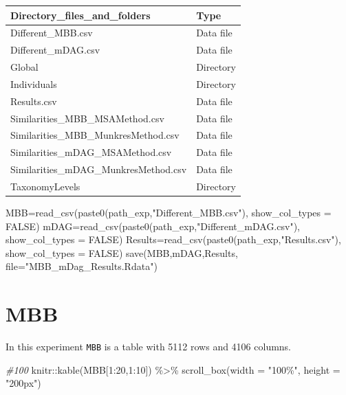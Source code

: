 \documentclass[
  letterpaper,
  DIV=11,
  numbers=noendperiod]{scrreprt}
\newenvironment{Shaded}{}{}
\newcommand{\AttributeTok}[1]{\textcolor[rgb]{0.78,0.47,0.87}{#1}}
\newcommand{\CommentTok}[1]{\textcolor[rgb]{0.36,0.39,0.44}{\textit{#1}}}
\newcommand{\ConstantTok}[1]{\textcolor[rgb]{0.82,0.60,0.40}{#1}}
\newcommand{\DecValTok}[1]{\textcolor[rgb]{0.82,0.60,0.40}{#1}}
\newcommand{\FunctionTok}[1]{\textcolor[rgb]{0.38,0.69,0.94}{#1}}
\newcommand{\NormalTok}[1]{\textcolor[rgb]{0.67,0.70,0.75}{#1}}
\newcommand{\OtherTok}[1]{\textcolor[rgb]{0.15,0.68,0.38}{#1}}
\newcommand{\SpecialCharTok}[1]{\textcolor[rgb]{0.34,0.71,0.76}{#1}}
\newcommand{\StringTok}[1]{\textcolor[rgb]{0.60,0.76,0.47}{#1}}
\begin{document}
\begin{tabular}{l|l}
\hline
Directory\_files\_and\_folders & Type\\
\hline
Different\_MBB.csv & Data file\\
\hline
Different\_mDAG.csv & Data file\\
\hline
Global & Directory\\
\hline
Individuals & Directory\\
\hline
Results.csv & Data file\\
\hline
Similarities\_MBB\_MSAMethod.csv & Data file\\
\hline
Similarities\_MBB\_MunkresMethod.csv & Data file\\
\hline
Similarities\_mDAG\_MSAMethod.csv & Data file\\
\hline
Similarities\_mDAG\_MunkresMethod.csv & Data file\\
\hline
TaxonomyLevels & Directory\\
\hline
\end{tabular}

\begin{Shaded}
\begin{Highlighting}[]
\NormalTok{MBB}\OtherTok{=}\FunctionTok{read\_csv}\NormalTok{(}\FunctionTok{paste0}\NormalTok{(path\_exp,}\StringTok{"Different\_MBB.csv"}\NormalTok{),}
             \AttributeTok{show\_col\_types =} \ConstantTok{FALSE}\NormalTok{)}
\NormalTok{mDAG}\OtherTok{=}\FunctionTok{read\_csv}\NormalTok{(}\FunctionTok{paste0}\NormalTok{(path\_exp,}\StringTok{"Different\_mDAG.csv"}\NormalTok{),}
              \AttributeTok{show\_col\_types =} \ConstantTok{FALSE}\NormalTok{)}
\NormalTok{Results}\OtherTok{=}\FunctionTok{read\_csv}\NormalTok{(}\FunctionTok{paste0}\NormalTok{(path\_exp,}\StringTok{"Results.csv"}\NormalTok{),}
                 \AttributeTok{show\_col\_types =} \ConstantTok{FALSE}\NormalTok{)}
\FunctionTok{save}\NormalTok{(MBB,mDAG,Results,}
     \AttributeTok{file=}\StringTok{"MBB\_mDag\_Results.Rdata"}\NormalTok{)}
\end{Highlighting}
\end{Shaded}

\hypertarget{mbb}{%
\section{MBB}\label{mbb}}

In this experiment \texttt{MBB} is a table with 5112 rows and 4106
columns.

\begin{Shaded}
\begin{Highlighting}[]
\CommentTok{\#100}
\NormalTok{knitr}\SpecialCharTok{::}\FunctionTok{kable}\NormalTok{(MBB[}\DecValTok{1}\SpecialCharTok{:}\DecValTok{20}\NormalTok{,}\DecValTok{1}\SpecialCharTok{:}\DecValTok{10}\NormalTok{]) }\SpecialCharTok{\%\textgreater{}\%}   
  \FunctionTok{scroll\_box}\NormalTok{(}\AttributeTok{width =} \StringTok{"100\%"}\NormalTok{, }\AttributeTok{height =} \StringTok{"200px"}\NormalTok{)}
\end{Highlighting}
\end{Shaded}
\end{document}
